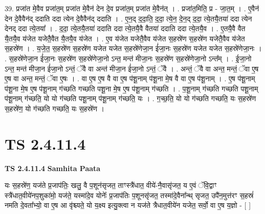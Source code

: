 \documentclass[17pt]{extarticle}
\begin{document}
39. प्रजा॑त मे॒वैव प्रजा॑त॒म् प्रजा॑त मे॒वैन॑ देन दे॒व प्रजा॑त॒म् प्रजा॑त मे॒वैन॑त् । . प्रजा॑त॒मिति॒ प्र - जा॒त॒म् । . ए॒वैन॑ देन दे॒वैवैन॑द् ददाति ददा त्येन दे॒वैवैन॑द् ददाति । . ए॒न॒द् द॒दा॒ति॒ द॒दा॒ त्ये॒न॒ दे॒न॒द् द॒दा॒ त्ये॒तयै॒तया॑ ददा त्येन देनद् ददा त्ये॒तया᳚ । . द॒दा॒ त्ये॒तयै॒तया॑ ददाति ददा त्ये॒तयै॒वै वैतया॑ ददाति ददा त्ये॒तयै॒व । . ए॒तयै॒वै वैत यै॒तयै॒व य॑जेत यजेतै॒वैत यै॒तयै॒व य॑जेत । . ए॒व य॑जेत यजेतै॒वैव य॑जेत स॒हस्रे॑ण स॒हस्रे॑ण यजेतै॒वैव य॑जेत स॒हस्रे॑ण । . य॒जे॒त॒ स॒हस्रे॑ण स॒हस्रे॑ण यजेत यजेत स॒हस्रे॑णेजा॒न ई॑जा॒नः स॒हस्रे॑ण यजेत यजेत स॒हस्रे॑णेजा॒नः । . स॒हस्रे॑णेजा॒न ई॑जा॒नः स॒हस्रे॑ण स॒हस्रे॑णेजा॒नो ऽन्त॒ मन्त॑ मीजा॒नः स॒हस्रे॑ण स॒हस्रे॑णेजा॒नो ऽन्त᳚म् । . ई॒जा॒नो ऽन्त॒ मन्त॑ मीजा॒न ई॑जा॒नो ऽन्तं॒ ॅवै वा अन्त॑ मीजा॒न ई॑जा॒नो ऽन्तं॒ ॅवै । . अन्तं॒ ॅवै वा अन्त॒ मन्तं॒ ॅवा ए॒ष ए॒ष वा अन्त॒ मन्तं॒ ॅवा ए॒षः । . वा ए॒ष ए॒ष वै वा ए॒ष प॑शू॒नाम् प॑शू॒ना मे॒ष वै वा ए॒ष प॑शू॒नाम् । . ए॒ष प॑शू॒नाम् प॑शू॒ना मे॒ष ए॒ष प॑शू॒नाम् ग॑च्छति गच्छति पशू॒ना मे॒ष ए॒ष प॑शू॒नाम् ग॑च्छति । . प॒शू॒नाम् ग॑च्छति गच्छति पशू॒नाम् प॑शू॒नाम् ग॑च्छति॒ यो यो ग॑च्छति पशू॒नाम् प॑शू॒नाम् ग॑च्छति॒ यः । . ग॒च्छ॒ति॒ यो यो ग॑च्छति गच्छति॒ यः स॒हस्रे॑ण स॒हस्रे॑ण॒ यो ग॑च्छति गच्छति॒ यः स॒हस्रे॑ण । \newline
\pagebreak
{}
\section*{ TS 2.4.11.4 }

\textbf{TS 2.4.11.4 } \newline
\textbf{Samhita Paata} \newline

यः स॒हस्रे॑ण॒ यज॑ते प्र॒जाप॑तिः॒ खलु॒ वै प॒शून॑सृजत॒ ताꣳस्त्रै॑धात॒ वीये॑-नै॒वासृ॑जत॒ य ए॒वं ॅवि॒द्वाꣳ स्त्रै॑धात॒वीये॑नप॒शुका॑मो॒ यज॑ते॒ यस्मा॑दे॒व योनेः᳚ प्र॒जाप॑तिः प॒शूनसृ॑जत॒ तस्मा॑दे॒वैना᳚न्थ् सृजत॒ उपै॑न॒मुत्त॑रꣳ स॒हस्रं॑ नमति दे॒वता᳚भ्यो॒ वा ए॒ष आ वृ॑श्च्यते॒ यो य॒क्ष्य इत्यु॒क्त्वा न यज॑ते त्रैधात॒वीये॑न यजेत॒ सर्वो॒ वा ए॒ष य॒ज्ञो - [  ] \newline
\end{document}
